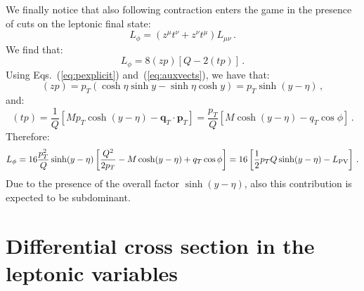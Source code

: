 \documentclass[10pt,a4paper]{article}
\begin{document}
We finally notice that also following contraction enters the game in
the presence of cuts on the leptonic final state:
\begin{equation}
  L_\phi=(z^\mu t^\nu+z^\nu t^\mu)L_{\mu\nu}\,.
\end{equation}
We find that:
\begin{equation}
L_\phi=8(zp)\left[Q-2(tp)\right]\,.
\end{equation}
Using Eqs.~(\ref{eq:pexplicit}) and~(\ref{eq:auxvects}), we
have that:
\begin{equation}
(zp) = p_T(\cosh\eta\sinh y-\sinh\eta\cosh y) = p_T\sinh(y-\eta)\,,
\end{equation}
and:
\begin{equation}
(tp) = \frac1{Q}\left[Mp_T\cosh(y-\eta)-\mathbf{q}_T\cdot
  \mathbf{p}_T\right] = \frac{p_T}{Q}\left[M\cosh(y-\eta)-q_T\cos\phi\right]\,.
\end{equation}
Therefore:
\begin{equation}
L_\phi=16 \frac{p_T^2}{Q}\sinh(y-\eta)\left[\frac{Q^2}{2 p_T
  }-M\cosh(y-\eta)+q_T\cos\phi\right]=16\left[\frac12p_TQ\sinh(y-\eta)-L_{\rm PV}\right]\,.
\end{equation}
Due to the presence of the overall factor $\sinh(y-\eta)$, also this
contribution is expected to be subdominant.

\section{Differential cross section in the leptonic variables}
\end{document}
